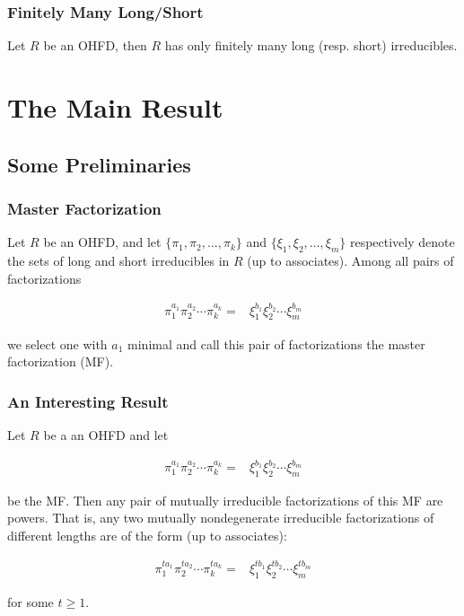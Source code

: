 \begin{frame}
	\frametitle{Finitely Many Long/Short}
	\begin{fact}
		Let $R$ be an OHFD, then $R$ has only finitely many long (resp. short) irreducibles.
	\end{fact}
\end{frame}

\section{The Main Result}

\subsection{Some Preliminaries }

\begin{frame}
  \frametitle{Master Factorization }
  \begin{definition}
    Let $R$ be an OHFD, and let $\{\pi_{1},\pi_{2},\ldots,\pi_{k}\}$ and $\{\xi_{1},\xi_{2},\ldots,\xi_{m}\}$ respectively denote the sets of long and short irreducibles in $R$ (up to associates).
    Among all pairs of factorizations

    \begin{align*}
      \pi_{1}^{a_{1}}\pi_{2}^{a_{2}}\cdots\pi_{k}^{a_{k}}= & \xi_{1}^{b_{1}}\xi_{2}^{b_{2}}\cdots\xi_{m}^{b_{m}}
    \end{align*}

    we select one with $a_{1}$ minimal and call this pair of factorizations the \alert{master factorization (MF)}.
  \end{definition}
\end{frame}

\begin{frame}
  \frametitle{An Interesting Result }
  \begin{fact}
    Let $R$ be a an OHFD and let

    \begin{align*}
      \pi_{1}^{a_{1}}\pi_{2}^{a_{2}}\cdots\pi_{k}^{a_{k}}= & \xi_{1}^{b_{1}}\xi_{2}^{b_{2}}\cdots\xi_{m}^{b_{m}}
    \end{align*}

    be the MF.
    Then any pair of mutually irreducible factorizations of this MF are powers.
    That is, any two mutually nondegenerate irreducible factorizations of different lengths are of the form (up to associates):

    \begin{align*}
      \pi_{1}^{ta_{1}}\pi_{2}^{ta_{2}}\cdots\pi_{k}^{ta_{k}}= & \xi_{1}^{tb_{1}}\xi_{2}^{tb_{2}}\cdots\xi_{m}^{tb_{m}}
    \end{align*}

    for some $t\geq1$.
  \end{fact}
\end{frame}

